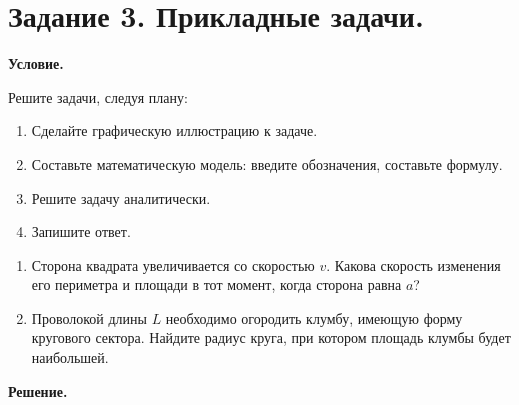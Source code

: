 \section{Задание 3. Прикладные задачи.}

\textbf{Условие.}

Решите задачи, следуя плану:
\begin{enumerate}
    \item Сделайте графическую иллюстрацию к задаче.
    \item Составьте математическую модель: введите обозначения, составьте формулу.
    \item Решите задачу аналитически.
    \item Запишите ответ.
\end{enumerate}

\begin{enumerate}
    \item Сторона квадрата увеличивается со скоростью $v$.
    Какова скорость изменения его периметра и площади в тот момент, когда сторона равна $a$?
    \item Проволокой длины $L$ необходимо огородить клумбу, имеющую форму кругового сектора.
    Найдите радиус круга, при котором площадь клумбы будет наибольшей.
\end{enumerate}
\vspace{10mm}
\textbf{Решение.}

